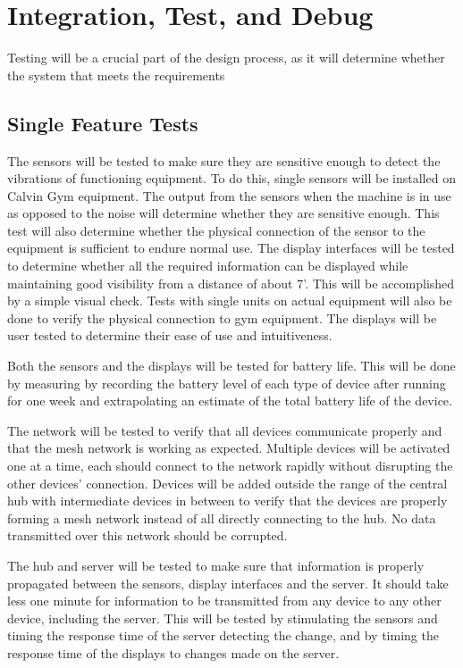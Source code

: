 \documentclass[PPFS.tex]{template/subfiles}
\begin{document}
\section{Integration, Test, and Debug}
Testing will be a crucial part of the design process, as it will determine whether the system that meets the requirements 

\subsection{Single Feature Tests}
The sensors will be tested to make sure they are sensitive enough to detect the vibrations of functioning equipment.  To do this, single sensors will be installed on Calvin Gym equipment. The output from the sensors when the machine is in use as opposed to the noise will determine whether they are sensitive enough. This test will also determine whether the physical connection of the sensor to the equipment is sufficient to endure normal use.
The display interfaces will be tested to determine whether all the required information can be displayed while maintaining good visibility from a distance of about 7'. This will be accomplished by a simple visual check. Tests with single units on actual equipment will also be done to verify the physical connection to gym equipment. The displays will be user tested to determine their ease of use and intuitiveness.

Both the sensors and the displays will be tested for battery life. This will be done by measuring by recording the battery level of each type of device after running for one week and extrapolating an estimate of the total battery life of the device.

The network will be tested to verify that all devices communicate properly and that the mesh network is working as expected. Multiple devices will be activated one at a time, each should connect to the network rapidly without disrupting the other devices’ connection. Devices will be added outside the range of the central hub with intermediate devices in between to verify that the devices are properly forming a mesh network instead of all directly connecting to the hub. No data transmitted over this network should be corrupted.

The hub and server will be tested to make sure that information is properly propagated between the sensors, display interfaces and the server. It should take less one minute for information to be transmitted from any device to any other device, including the server. This will be tested by stimulating the sensors and timing the response time of the server detecting the change, and by timing the response time of the displays to changes made on the server. 
\end{document}
